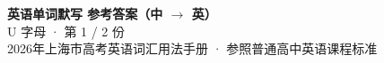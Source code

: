 \documentclass[10pt,a4paper]{article}
\begin{document}
\pagestyle{plain}

\begin{center}
{\LARGE\bfseries 英语单词默写 \quad 参考答案（中 $\to$ 英）}\\[0.22em]
{\large U 字母 · 第 1 / 2 份}\\[0.18em]
{\small 2026年上海市高考英语词汇用法手册 · 参照普通高中英语课程标准}
\end{center}

\vspace{0.2em}
\noindent{\color{rulegray}\rule{\textwidth}{0.8pt}}

\vspace{0.35em}

\vspace{0.25em}
\renewcommand{\arraystretch}{1.32}
\end{document}
